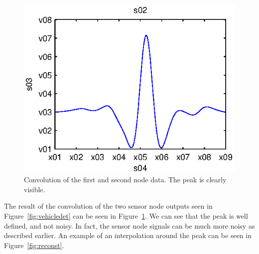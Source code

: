 \begin{subfigures}
\begin{figure}[!ht]
\begin{minipage}{0.45\linewidth}
   \includegraphics[width=\linewidth]{images/conv}
  \caption[Matched filter method. Convolution result.]{Convolution of the first and second node data. The peak is clearly visible.\\}
  \label{fig:conv}
  \end{minipage}
 \end{figure}
 \end{subfigures}

 The result of the convolution of the two sensor node outputs seen in Figure~\ref{fig:vehicledet} can be seen in Figure~\ref{fig:conv}. We can see that the peak is well defined, and not noisy. In fact, the sensor node signals can be much more noisy as described earlier. An example of an interpolation around the peak can be seen in Figure~\ref{fig:reconst}.

